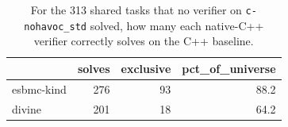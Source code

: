 \begin{table}[t]
  \centering
  \caption{For the 313 shared tasks that no verifier on \texttt{c-nohavoc_std} solved, how many each native-C++ verifier correctly solves on the C++ baseline.}
  \label{tab:unique-cpp-breakdown}
\begin{tabular}{lrrr}
\toprule
 & solves & exclusive & pct\_of\_universe \\
\midrule
esbmc-kind & 276 & 93 & 88.2 \\
divine & 201 & 18 & 64.2 \\
\bottomrule
\end{tabular}
\end{table}
